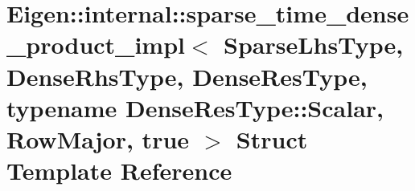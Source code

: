 \hypertarget{struct_eigen_1_1internal_1_1sparse__time__dense__product__impl_3_01_sparse_lhs_type_00_01_dense_b414480199bc806c66dca70961af5e2d}{}\section{Eigen\+:\+:internal\+:\+:sparse\+\_\+time\+\_\+dense\+\_\+product\+\_\+impl$<$ Sparse\+Lhs\+Type, Dense\+Rhs\+Type, Dense\+Res\+Type, typename Dense\+Res\+Type\+:\+:Scalar, Row\+Major, true $>$ Struct Template Reference}
\label{struct_eigen_1_1internal_1_1sparse__time__dense__product__impl_3_01_sparse_lhs_type_00_01_dense_b414480199bc806c66dca70961af5e2d}
